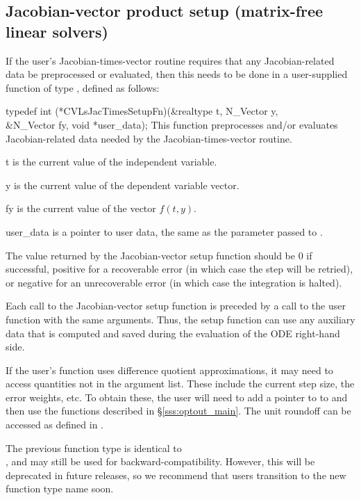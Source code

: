 \subsection{Jacobian-vector product setup (matrix-free linear solvers)}\label{ss:jtsetupFn}

If the user's Jacobian-times-vector routine requires that any
Jacobian-related data be preprocessed or evaluated, then this needs to
be done in a user-supplied function of type ,
defined as follows:

{
  typedef int (*CVLsJacTimesSetupFn)(&realtype t, N\_Vector y, \\
                                     &N\_Vector fy, void *user\_data);
}
{
  This function preprocesses and/or evaluates Jacobian-related data needed
  by the Jacobian-times-vector routine.
}
{
  \begin{args}
  \item[t]
    is the current value of the independent variable.
  \item[y]
    is the current value of the dependent variable vector.
  \item[fy]
    is the current value of the vector $f(t,y)$.
  \item[user\_data]
    is a pointer to user data, the same as the 
    parameter passed to .
  \end{args}
}
{
  The value returned by the Jacobian-vector setup function
  should be $0$ if successful, positive for a recoverable error (in
  which case the step will be retried), or negative for an
  unrecoverable error (in which case the integration is halted). }
{
  Each call to the Jacobian-vector setup function is preceded by a call to
  the  user function with the same  arguments.
  Thus, the setup function can use any auxiliary data that is computed
  and saved during the evaluation of the ODE right-hand side.

  If the user's  function uses difference quotient
  approximations, it may need to access quantities not in the argument
  list. These include the current step size, the error weights, etc.
  To obtain these, the user will need to add a pointer to 
  to  and then use the  functions described in
  \S\ref{sss:optout_main}. The unit roundoff can be accessed as
   defined in .

  The previous function type  is identical
  to\\ \noindent {}, and may still be used for
  backward-compatibility.  However, this will be deprecated in future
  releases, so we recommend that users transition to the new function
  type name soon.
}


